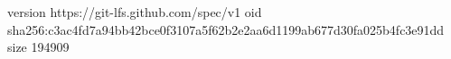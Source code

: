 version https://git-lfs.github.com/spec/v1
oid sha256:c3ac4fd7a94bb42bce0f3107a5f62b2e2aa6d1199ab677d30fa025b4fc3e91dd
size 194909
